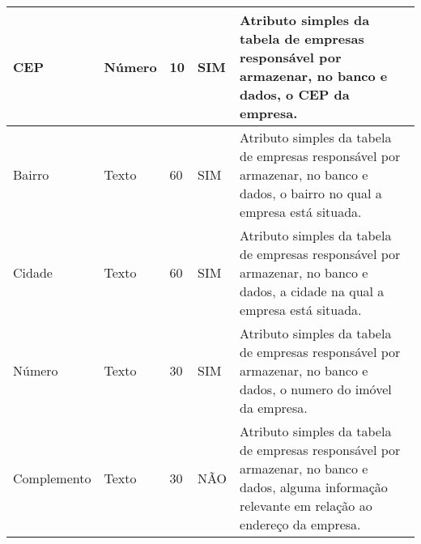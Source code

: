 \begin{enumerate}[label=RN\arabic*]
\begin{table}[htb]
\begin{tabular}{|p{3.0cm}|p{2.0cm}|p{1.5cm}|p{2.0cm}|p{5.75cm}|}
			CEP             & Número        & 10               & SIM                  & Atributo simples da tabela de empresas responsável por armazenar, no banco e dados, o CEP da empresa.                                              \\ \hline
			Bairro          & Texto         & 60               & SIM                  & Atributo simples da tabela de empresas responsável por armazenar, no banco e dados, o bairro no qual a empresa está situada.                       \\ \hline
			Cidade          & Texto         & 60               & SIM                  & Atributo simples da tabela de empresas responsável por armazenar, no banco e dados, a cidade na qual a empresa está situada.                       \\ \hline
			Número          & Texto         & 30               & SIM                  & Atributo simples da tabela de empresas responsável por armazenar, no banco e dados, o numero do imóvel da empresa.                                 \\ \hline
			Complemento     & Texto         & 30               & NÃO                  & Atributo simples da tabela de empresas responsável por armazenar, no banco e dados, alguma informação relevante em relação ao endereço da empresa. \\ \hline
		\end{tabular}
	\end{table}
\end{enumerate}

